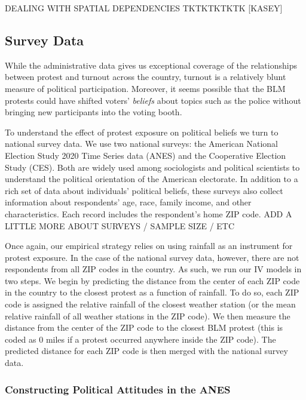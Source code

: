 \documentclass[
  12pt,
]{article}
\begin{document}
DEALING WITH SPATIAL DEPENDENCIES
TKTKTKTKTK {[}KASEY{]}

\hypertarget{survey-data}{%
\subsection*{Survey Data}\label{survey-data}}

While the administrative data gives us exceptional coverage of the relationships between protest and turnout across the country, turnout is a relatively blunt measure of political participation. Moreover, it seems possible that the BLM protests could have shifted voters' \emph{beliefs} about topics such as the police without bringing new participants into the voting booth.

To understand the effect of protest exposure on political beliefs we turn to national survey data. We use two national surveys: the American National Election Study 2020 Time Series data (ANES) and the Cooperative Election Study (CES). Both are widely used among sociologists and political scientists to understand the political orientation of the American electorate. In addition to a rich set of data about individuals' political beliefs, these surveys also collect information about respondents' age, race, family income, and other characteristics. Each record includes the respondent's home ZIP code. ADD A LITTLE MORE ABOUT SURVEYS / SAMPLE SIZE / ETC

Once again, our empirical strategy relies on using rainfall as an instrument for protest exposure. In the case of the national survey data, however, there are not respondents from all ZIP codes in the country. As such, we run our IV models in two steps. We begin by predicting the distance from the center of each ZIP code in the country to the closest protest as a function of rainfall. To do so, each ZIP code is assigned the relative rainfall of the closest weather station (or the mean relative rainfall of all weather stations in the ZIP code). We then measure the distance from the center of the ZIP code to the closest BLM protest (this is coded as 0 miles if a protest occurred anywhere inside the ZIP code). The predicted distance for each ZIP code is then merged with the national survey data.

\hypertarget{constructing-political-attitudes-in-the-anes}{%
\subsubsection*{Constructing Political Attitudes in the ANES}\label{constructing-political-attitudes-in-the-anes}}
\end{document}
